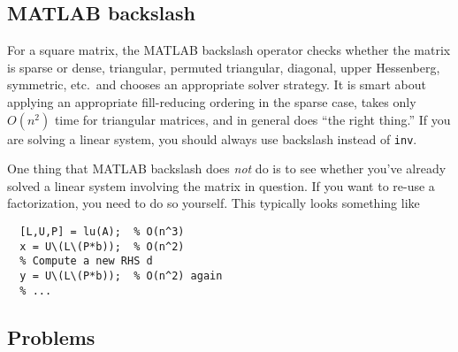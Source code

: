 \documentclass[12pt, leqno]{article}
\begin{document}
\subsection{MATLAB backslash}

For a square matrix, the MATLAB backslash operator checks whether the
matrix is sparse or dense, triangular, permuted triangular, diagonal,
upper Hessenberg, symmetric, etc.~and chooses an appropriate solver
strategy.  It is smart about applying an appropriate fill-reducing
ordering in the sparse case, takes only $O(n^2)$ time for triangular
matrices, and in general does ``the right thing.''  If you are solving
a linear system, you should always use backslash instead of {\tt inv}.

One thing that MATLAB backslash does {\em not} do is to see whether
you've already solved a linear system involving the matrix in
question.  If you want to re-use a factorization, you need to do so
yourself.  This typically looks something like
\begin{lstlisting}
  [L,U,P] = lu(A);  % O(n^3)
  x = U\(L\(P*b));  % O(n^2)
  % Compute a new RHS d
  y = U\(L\(P*b));  % O(n^2) again
  % ...
\end{lstlisting}

\subsection{Problems}
\end{document}
